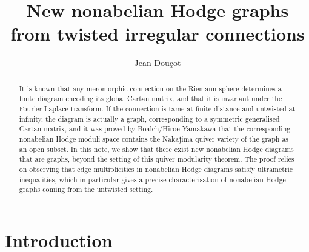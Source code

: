 \documentclass[11pt,a4paper]{amsart}
\numberwithin{equation}{section}
\begin{document}
\renewcommand{\proofname}{Proof}
\renewcommand{\Re}{\operatorname{Re}}
\renewcommand{\Im}{\operatorname{Im}}
\renewcommand{\labelitemi}{$\bullet$}


\newtheorem{theorem}{Theorem}[section]
\newtheorem{proposition}[theorem]{Proposition}
\newtheorem{lemma}[theorem]{Lemma}
\newtheorem{corollary}[theorem]{Corollary}
\newtheorem{conjecture}[theorem]{Conjecture}

\theoremstyle{definition}
\newtheorem{definition}[theorem]{Definition}
\newtheorem{example}{Example}[section]
\theoremstyle{remark}
\newtheorem{remark}{Remark}[section]
\newtheorem*{claim}{Claim}


\title{New nonabelian Hodge graphs from twisted irregular connections}

\author{Jean Douçot}


\address[J.~Douçot]{`Simion Stoilow' Institute of Mathematics of the Romanian Academy,
	Calea Griviței 21,
	010702-Bucharest, 
	Sector 1, 
	Romania}

\maketitle

\begin{abstract}
It is known that any meromorphic connection on the Riemann sphere determines a finite diagram encoding its global Cartan matrix, and that it is invariant under the Fourier-Laplace transform.
If the connection is tame at finite distance and untwisted at infinity, the diagram is actually a graph, corresponding to a symmetric generalised Cartan matrix, and it was proved by Boalch/Hiroe-Yamakawa that the corresponding nonabelian Hodge moduli space contains the Nakajima quiver variety of the graph as an open subset.
In this note, we show that there exist new nonabelian Hodge diagrams that are graphs, beyond the setting of this quiver modularity theorem. The proof relies on observing that edge multiplicities in nonabelian Hodge diagrams satisfy ultrametric inequalities, which in particular gives a precise characterisation of nonabelian Hodge graphs coming from the untwisted setting.
\end{abstract}


\section{Introduction}
\end{document}
